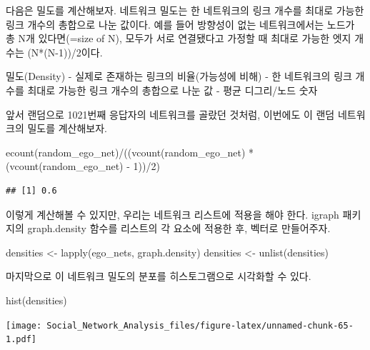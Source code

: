 \documentclass[
]{book}
\newenvironment{Shaded}{\begin{snugshade}}{\end{snugshade}}
\newcommand{\DecValTok}[1]{\textcolor[rgb]{0.00,0.00,0.81}{#1}}
\newcommand{\FunctionTok}[1]{\textcolor[rgb]{0.00,0.00,0.00}{#1}}
\newcommand{\NormalTok}[1]{#1}
\newcommand{\OtherTok}[1]{\textcolor[rgb]{0.56,0.35,0.01}{#1}}
\newcommand{\SpecialCharTok}[1]{\textcolor[rgb]{0.00,0.00,0.00}{#1}}
\begin{document}
다음은 밀도를 계산해보자. 네트워크 밀도는 한 네트워크의 링크 개수를 최대로 가능한 링크 개수의 총합으로 나눈 값이다. 예를 들어 방향성이 없는 네트워크에서는 노드가 총 N개 있다면(=size of N), 모두가 서로 연결됐다고 가정할 때 최대로 가능한 엣지 개수는 (N*(N-1))/2이다.

밀도(Density)
- 실제로 존재하는 링크의 비율(가능성에 비해)
- 한 네트워크의 링크 개수를 최대로 가능한 링크 개수의 총합으로 나눈 값
- 평균 디그리/노드 숫자

앞서 랜덤으로 1021번째 응답자의 네트워크를 골랐던 것처럼, 이번에도 이 랜덤 네트워크의 밀도를 계산해보자.

\begin{Shaded}
\begin{Highlighting}[]
\FunctionTok{ecount}\NormalTok{(random\_ego\_net)}\SpecialCharTok{/}\NormalTok{((}\FunctionTok{vcount}\NormalTok{(random\_ego\_net) }\SpecialCharTok{*}\NormalTok{ (}\FunctionTok{vcount}\NormalTok{(random\_ego\_net) }\SpecialCharTok{{-}} \DecValTok{1}\NormalTok{))}\SpecialCharTok{/}\DecValTok{2}\NormalTok{)}
\end{Highlighting}
\end{Shaded}

\begin{verbatim}
## [1] 0.6
\end{verbatim}

이렇게 계산해볼 수 있지만, 우리는 네트워크 리스트에 적용을 해야 한다. igraph 패키지의 graph.density 함수를 리스트의 각 요소에 적용한 후, 벡터로 만들어주자.

\begin{Shaded}
\begin{Highlighting}[]
\NormalTok{densities }\OtherTok{\textless{}{-}} \FunctionTok{lapply}\NormalTok{(ego\_nets, graph.density)}
\NormalTok{densities }\OtherTok{\textless{}{-}} \FunctionTok{unlist}\NormalTok{(densities)}
\end{Highlighting}
\end{Shaded}

마지막으로 이 네트워크 밀도의 분포를 히스토그램으로 시각화할 수 있다.

\begin{Shaded}
\begin{Highlighting}[]
\FunctionTok{hist}\NormalTok{(densities)}
\end{Highlighting}
\end{Shaded}

\texttt{[image: Social\_Network\_Analysis\_files/figure-latex/unnamed-chunk-65-1.pdf]}
\end{document}
